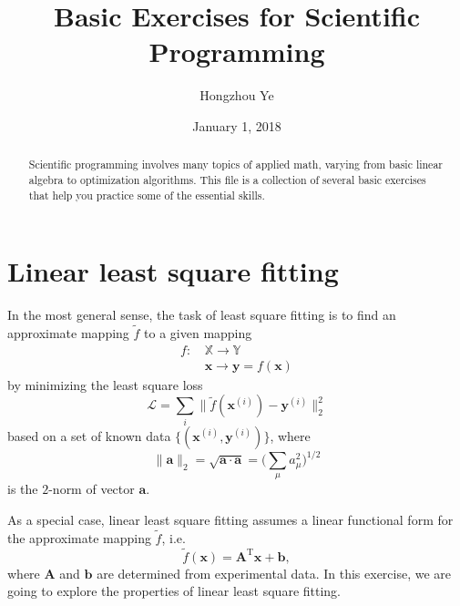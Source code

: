 \documentclass[a4paper,twoside, 10pt]{article}
\title{Basic Exercises for Scientific Programming}
\author{Hongzhou Ye}
\date{January 1, 2018}							%
\theoremstyle{wick}
\newcommand{\tr}{\textrm}
\newcommand{\mat}[1]{\mathbf{#1}}
\begin{document}
	\maketitle{}

	\begin{abstract}
		Scientific programming involves many topics of applied math, varying from basic linear algebra to optimization algorithms. This file is a collection of several basic exercises that help you practice some of the essential skills.
	\end{abstract}

	\section{Linear least square fitting}

	In the most general sense, the task of least square fitting is to find an approximate mapping $\tilde{f}$ to a given mapping
	\begin{equation}
	\begin{split}
		f:&\, \mathbb{X} \rightarrow \mathbb{Y}	\\
		  &\, \bm{x} \rightarrow \bm{y} = f(\bm{x})
	\end{split}
	\end{equation}
	by minimizing the least square loss
	\begin{equation}
		\mathcal{L}
			= \sum_{i} \big\|\tilde{f}(\bm{x}^{(i)}) - \bm{y}^{(i)}\big\|_2^2
	\end{equation}
	based on a set of known data $\{(\bm{x}^{(i)}, \bm{y}^{(i)})\}$, where
	\begin{equation}
		\|\bm{a}\|_2
			= \sqrt{\bm{a} \cdot \bm{a}}
			= \bigg(\sum_{\mu} a_{\mu}^2\bigg)^{1/2}
	\end{equation}
	is the $2$-norm of vector $\bm{a}$.

	As a special case, linear least square fitting assumes a linear functional form for the approximate mapping $\tilde{f}$, i.e.
	\begin{equation}
		\tilde{f}(\bm{x})
			= \mat{A}^{\tr{T}}\bm{x} + \bm{b},
	\end{equation}
	where $\mat{A}$ and $\bm{b}$ are determined from experimental data. In this exercise, we are going to explore the properties of linear least square fitting.
\end{document}
